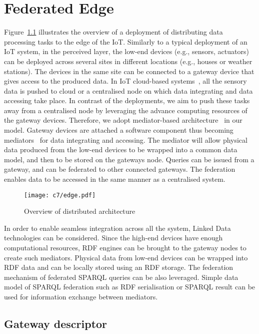 \chapter{Federated Edge}


Figure~\ref{fig:edge} illustrates the overview of a deployment of distributing data processing tasks to the edge of the IoT.
Similarly to a typical deployment of an IoT system, in the perceived layer, the low-end devices (e.g., sensors, actuators) can be deployed across several sites in different locations (e.g., houses or weather stations).
The devices in the same site can be connected to a gateway device that gives access to the produced data.
In IoT cloud-based systems~\cite{Petrolo:2014}, all the sensory data is pushed to cloud or a centralised node on which data integrating and data accessing take place.
In contrast of the deployments, we aim to push these tasks away from a centralised node by leveraging the advance computing resources of the gateway devices.
Therefore, we adopt mediator-based architecture~\cite{Garcia-molina:1995} in our model.
Gateway devices are attached a software component thus becoming mediators~\cite{Wiederhold:1992} for data integrating and accessing.
The mediator will allow physical data produced from the low-end devices to be wrapped into a common data model, and then to be stored on the gateways node.
Queries can be issued from a gateway, and can be federated to other connected gateways. 
The federation enables data to be accessed in the same manner as a centralised system. 

\begin{figure}[h!]
\centering
\texttt{[image: c7/edge.pdf]}
\caption{Overview of distributed architecture}
\label{fig:edge}
\end{figure}

In order to enable seamless integration across all the system, Linked Data technologies can be considered.
Since the high-end devices have enough computational resources, RDF engines can be brought to the gateway nodes to create such mediators.
Physical data from low-end devices can be wrapped into RDF data and can be locally stored using an RDF storage.
The federation mechanism of federated SPARQL queries can be also leveraged.
Simple data model of SPARQL federation such as RDF serialisation or SPARQL result can be used for information exchange between mediators.

\section{Gateway descriptor}

